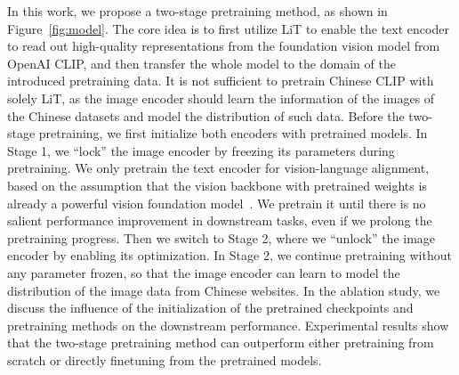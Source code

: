 \documentclass[11pt]{article}
\begin{document}
In this work, we propose a two-stage pretraining method, as shown in Figure~\ref{fig:model}. 
The core idea is to first utilize LiT to enable the text encoder to read out high-quality representations from the foundation vision model from OpenAI CLIP, and then transfer the whole model to the domain of the introduced pretraining data. 
It is not sufficient to pretrain Chinese CLIP with solely LiT, as the image encoder should learn the information of the images of the Chinese datasets and model the distribution of such data. 
Before the two-stage pretraining, we first initialize both encoders with pretrained models. 
In Stage 1, we ``lock'' the image encoder by freezing its parameters during pretraining. 
We only pretrain the text encoder for vision-language alignment, based on the assumption that the vision backbone with pretrained weights is already a powerful vision foundation model~\citep{lit, wukong}. 
We pretrain it until there is no salient performance improvement in downstream tasks, even if we prolong the pretraining progress. 
Then we switch to Stage 2, where we ``unlock'' the image encoder by enabling its optimization. 
In Stage 2, we continue pretraining without any parameter frozen, so that the image encoder can learn to model the distribution of the image data from Chinese websites. 
In the ablation study, we discuss the influence of the initialization of the pretrained checkpoints and pretraining methods on the downstream performance. 
Experimental results show that the two-stage pretraining method can outperform either pretraining from scratch or directly finetuning from the pretrained models. 
\end{document}

